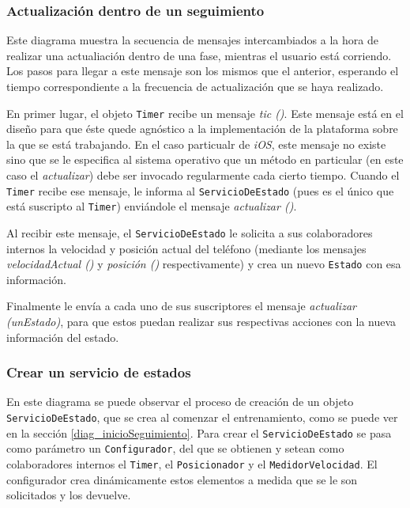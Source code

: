 \subsubsection{Actualización dentro de un seguimiento} \label{unaSeccion}

Este diagrama muestra la secuencia de mensajes intercambiados a la hora de realizar una actualiación dentro de una fase, mientras el usuario está corriendo. Los pasos para llegar a este mensaje son los mismos que el anterior, esperando el tiempo correspondiente a la frecuencia de actualización que se haya realizado.


En primer lugar, el objeto \texttt{Timer} recibe un mensaje \emph{tic ()}. Este mensaje está en el diseño para que éste quede agnóstico a la implementación de la plataforma sobre la que se está trabajando. En el caso particualr de \emph{iOS}, este mensaje no existe sino que se le especifica al sistema operativo que un método en particular (en este caso el \emph{actualizar}) debe ser invocado regularmente cada cierto tiempo. Cuando el \texttt{Timer} recibe ese mensaje, le informa al \texttt{ServicioDeEstado} (pues es el único que está suscripto al \texttt{Timer}) enviándole el mensaje \emph{actualizar ()}.


Al recibir este mensaje, el \texttt{ServicioDeEstado} le solicita a sus colaboradores internos la velocidad y posición actual del teléfono (mediante los mensajes \emph{velocidadActual ()} y \emph{posición ()} respectivamente) y crea un nuevo \texttt{Estado} con esa información.


Finalmente le envía a cada uno de sus suscriptores el mensaje \emph{actualizar (unEstado)}, para que estos puedan realizar sus respectivas acciones con la nueva información del estado. 

\subsubsection{Crear un servicio de estados}\label{diag_crearUnServicioDeEstado}

En este diagrama se puede observar el proceso de creación de un objeto \texttt{ServicioDeEstado}, que se crea al comenzar el entrenamiento, como se puede ver en la sección \ref{diag_inicioSeguimiento}. Para crear el \texttt{ServicioDeEstado}
 se pasa como parámetro un \texttt{Configurador}, del que se obtienen y setean como colaboradores internos el \texttt{Timer}, el \texttt{Posicionador} y el \texttt{MedidorVelocidad}. El configurador crea dinámicamente estos elementos a medida que se le son solicitados y los devuelve.

